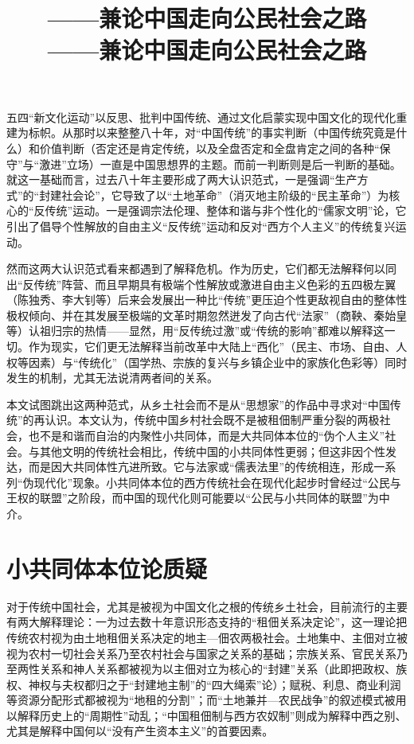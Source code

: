 \documentclass[a4paper,12pt,punct=kaiming,fontset=none]{ctexart}
\title{\bfseries\titleContent \\[1em] \large\normalfont——兼论中国走向公民社会之路}
\title{\Large\bfseries\titleContent \\[1em] \small\normalfont——兼论中国走向公民社会之路}
\author{\authorContent}
\date{}
\begin{document}
\maketitle


五四“新文化运动”以反思、批判中国传统、通过文化启蒙实现中国文化的现代化重建为标帜。从那时以来整整八十年，对“中国传统”的事实判断（中国传统究竟是什么）和价值判断（否定还是肯定传统，以及全盘否定和全盘肯定之间的各种“保守”与“激进”立场）一直是中国思想界的主题。而前一判断则是后一判断的基础。就这一基础而言，过去八十年主要形成了两大认识范式，一是强调“生产方式”的“封建社会论”，它导致了以“土地革命”（消灭地主阶级的“民主革命”）为核心的“反传统”运动。一是强调宗法伦理、整体和谐与非个性化的“儒家文明”论，它引出了倡导个性解放的自由主义“反传统”运动和反对“西方个人主义”的传统复兴运动。

然而这两大认识范式看来都遇到了解释危机。作为历史，它们都无法解释何以同出“反传统”阵营、而且早期具有极端个性解放或激进自由主义色彩的五四极左翼（陈独秀、李大钊等）后来会发展出一种比“传统”更压迫个性更敌视自由的整体性极权倾向、并在其发展至极端的文革时期忽然迸发了向古代“法家”（商鞅、秦始皇等）认祖归宗的热情——显然，用“反传统过激”或“传统的影响”都难以解释这一切。作为现实，它们更无法解释当前改革中大陆上“西化”（民主、市场、自由、人权等因素）与“传统化”（国学热、宗族的复兴与乡镇企业中的家族化色彩等）同时发生的机制，尤其无法说清两者间的关系。

本文试图跳出这两种范式，从乡土社会而不是从“思想家”的作品中寻求对“中国传统”的再认识。本文认为，传统中国乡村社会既不是被租佃制严重分裂的两极社会，也不是和谐而自治的内聚性小共同体，而是大共同体本位的“伪个人主义”社会。与其他文明的传统社会相比，传统中国的小共同体性更弱；但这非因个性发达，而是因大共同体性亢进所致。它与法家或“儒表法里”的传统相连，形成一系列“伪现代化”现象。小共同体本位的西方传统社会在现代化起步时曾经过“公民与王权的联盟”之阶段，而中国的现代化则可能要以“公民与小共同体的联盟”为中介。

\section*{小共同体本位论质疑}

对于传统中国社会，尤其是被视为中国文化之根的传统乡土社会，目前流行的主要有两大解释理论：一为过去数十年意识形态支持的“租佃关系决定论”，这一理论把传统农村视为由土地租佃关系决定的地主—佃农两极社会。土地集中、主佃对立被视为农村一切社会关系乃至农村社会与国家之关系的基础；宗族关系、官民关系乃至两性关系和神人关系都被视为以主佃对立为核心的“封建”关系（此即把政权、族权、神权与夫权都归之于“封建地主制”的“四大绳索”论）；赋税、利息、商业利润等资源分配形式都被视为“地租的分割”；而“土地兼并—农民战争”的叙述模式被用以解释历史上的“周期性”动乱；“中国租佃制与西方农奴制”则成为解释中西之别、尤其是解释中国何以“没有产生资本主义”的首要因素。
\end{document}
